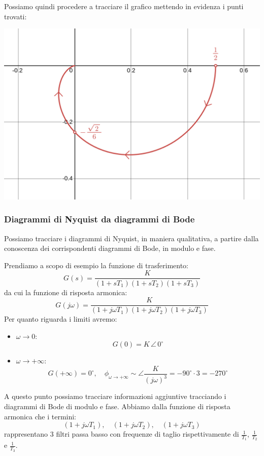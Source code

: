 \documentclass[a4paper,11pt]{article}
\begin{document}
\noindent
\begin{minipage}{\textwidth}

Possiamo quindi procedere a tracciare il grafico mettendo in evidenza i punti trovati:
\begin{center}
	\includegraphics[scale=0.28]{../figures/nyquist/first_ex.png}
\end{center}

\end{minipage}

\subsubsection{Diagrammi di Nyquist da diagrammi di Bode}
Possiamo tracciare i diagrammi di Nyquist, in maniera qualitativa, a partire dalla conoscenza dei corrispondenti diagrammi di Bode, in modulo e fase.

Prendiamo a scopo di esempio la funzione di trasferimento:
$$
G(s) = \frac{K}{ (1 + s T_1) (1 + s T_2) (1 + s T_3) }
$$
da cui la funzione di risposta armonica:
$$
G(j \omega) = \frac{K}{ (1 + j \omega T_1) (1 + j \omega T_2) (1 + j \omega T_3) }
$$
Per quanto riguarda i limiti avremo:
\begin{itemize}
	\item $\omega \rightarrow 0$:
	$$
	G(0) = K \, \angle \, 0^\circ
	$$
	\item $\omega \rightarrow +\infty$:
	$$
	G(+ \infty) = 0^\circ, \quad \phi_{\omega \rightarrow + \infty} \sim \angle \frac{K}{(j \omega)^3} = -90^\circ \cdot 3 = -270^\circ
	$$
\end{itemize}

A questo punto possiamo tracciare informazioni aggiuntive tracciando i diagrammi di Bode di modulo e fase.
Abbiamo dalla funzione di risposta armonica che i termini:
$$
(1 + j \omega T_1), \quad (1 + j \omega T_2), \quad (1 + j \omega T_3)
$$
rappresentano 3 filtri passa basso con frequenze di taglio rispettivamente di $\frac{1}{T_1}$, $\frac{1}{T_2}$ e $\frac{1}{T_3}$.
\end{document}
